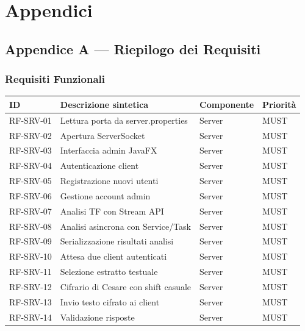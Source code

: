 \documentclass[12pt, a4paper]{article}
\begin{document}
\newpage
\section{Appendici}

\subsection{Appendice A — Riepilogo dei Requisiti}

\subsubsection{Requisiti Funzionali}

\begin{longtable}{|p{2.5cm}|p{7cm}|p{2cm}|p{1.5cm}|}
    \hline
    \rowcolor{primaryBlue!20}
    \textbf{ID} & \textbf{Descrizione sintetica} & \textbf{Componente} & \textbf{Priorità} \\
    \hline
    \endhead
    RF-SRV-01 & Lettura porta da server.properties & Server & MUST \\
    \hline
    RF-SRV-02 & Apertura ServerSocket & Server & MUST \\
    \hline
    RF-SRV-03 & Interfaccia admin JavaFX & Server & MUST \\
    \hline
    RF-SRV-04 & Autenticazione client & Server & MUST \\
    \hline
    RF-SRV-05 & Registrazione nuovi utenti & Server & MUST \\
    \hline
    RF-SRV-06 & Gestione account admin & Server & MUST \\
    \hline
    RF-SRV-07 & Analisi TF con Stream API & Server & MUST \\
    \hline
    RF-SRV-08 & Analisi asincrona con Service/Task & Server & MUST \\
    \hline
    RF-SRV-09 & Serializzazione risultati analisi & Server & MUST \\
    \hline
    RF-SRV-10 & Attesa due client autenticati & Server & MUST \\
    \hline
    RF-SRV-11 & Selezione estratto testuale & Server & MUST \\
    \hline
    RF-SRV-12 & Cifrario di Cesare con shift casuale & Server & MUST \\
    \hline
    RF-SRV-13 & Invio testo cifrato ai client & Server & MUST \\
    \hline
    RF-SRV-14 & Validazione risposte & Server & MUST \\

\end{longtable}
\end{document}
